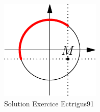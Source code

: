 \begin{figure}[h!]
 \centering
 \includegraphics{Cctrigus91_1.pdf}
 \caption{Solution Exercice Ectrigus91}
 \label{fig:Cctrigus91_1}
\end{figure}

